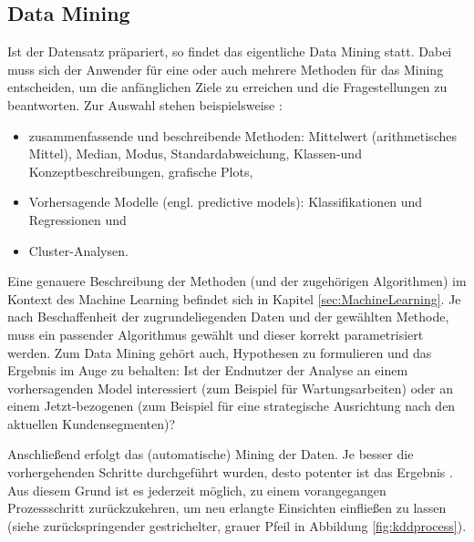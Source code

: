\subsection{Data Mining}\label{subsubsec:DataMining}
Ist der Datensatz präpariert, so findet das eigentliche Data Mining statt. Dabei muss sich der Anwender für eine oder auch mehrere Methoden für das Mining entscheiden, um die anfänglichen Ziele zu erreichen und die Fragestellungen zu beantworten. Zur Auswahl stehen beispielsweise :
\begin{itemize}
\item zusammenfassende und beschreibende Methoden: Mittelwert (arithmetisches Mittel), Median, Modus, Standardabweichung, Klassen-und Konzeptbeschreibungen, grafische Plots,
\item Vorhersagende Modelle (engl. predictive models): Klassifikationen und Regressionen und
\item Cluster-Analysen.
\end{itemize}
Eine genauere Beschreibung der Methoden (und der zugehörigen Algorithmen) im Kontext des Machine Learning befindet sich in Kapitel \ref{sec:MachineLearning}. Je nach Beschaffenheit der zugrundeliegenden Daten und der gewählten Methode, muss ein passender Algorithmus gewählt und dieser korrekt parametrisiert werden. Zum Data Mining gehört auch, Hypothesen zu formulieren und das Ergebnis im Auge zu behalten: Ist der Endnutzer der Analyse an einem vorhersagenden Model interessiert (zum Beispiel für Wartungsarbeiten) oder an einem Jetzt-bezogenen (zum Beispiel für eine strategische Ausrichtung nach den aktuellen Kundensegmenten)?\par
Anschließend erfolgt das (automatische) Mining der Daten. Je besser die vorhergehenden Schritte durchgeführt wurden, desto potenter ist das Ergebnis \citep[S.~42]{fayyad_data_1996}. Aus diesem Grund ist es jederzeit möglich, zu einem vorangegangen Prozessschritt zurückzukehren, um neu erlangte Einsichten einfließen zu lassen (siehe zurückspringender gestrichelter, grauer Pfeil in Abbildung \ref{fig:kddprocess}).


